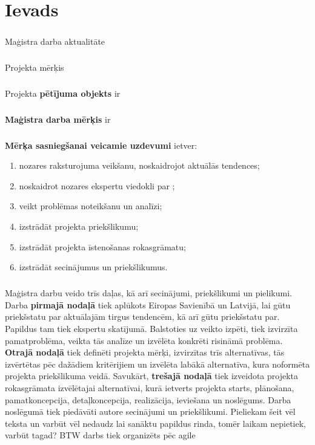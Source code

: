 \chapter*{Ievads} %
\paragraph{}
Maģistra darba aktualitāte
\paragraph{}
Projekta mērķis
\paragraph{}
Projekta \textbf{pētījuma objekts} ir 
\paragraph{}
\textbf{Maģistra darba mērķis} ir 
\paragraph{}
\textbf{Mērķa sasniegšanai veicamie uzdevumi} ietver:
\begin{enumerate}
    \item nozares raksturojuma veikšanu, noskaidrojot aktuālās tendences;
    \item noskaidrot nozares ekspertu viedokli par ;
    \item veikt problēmas noteikšanu un analīzi;
    \item izstrādāt projekta priekšlikumu;
    \item izstrādāt projekta īstenošanas rokasgrāmatu;
    \item izstrādāt secinājumus un priekšlikumus.
\end{enumerate}
\paragraph{}
Maģistra darbu veido trīs daļas, kā arī secinājumi, priekšlikumi un pielikumi.
Darba \textbf{pirmajā nodaļā} tiek aplūkots Eiropas Savienībā un Latvijā, lai gūtu priekšstatu par 
aktuālajām tirgus tendencēm, kā arī gūtu priekšstatu par. Papildus tam tiek ekspertu skatījumā. 
Balstoties uz veikto izpēti, tiek izvirzīta pamatproblēma, veikta tās analīze un izvēlēta konkrēti
risināmā problēma. 
\textbf{Otrajā nodaļā} tiek definēti projekta mērķi,
izvirzītas trīs alternatīvas, tās izvērtētas pēc dažādiem kritērijiem un izvēlēta labākā alternatīva, 
kura noformēta projekta priekšlikuma veidā. 
Savukārt, \textbf{trešajā nodaļā} tiek izveidota projekta
rokasgrāmata izvēlētajai alternatīvai, kurā ietverts projekta starts, plānošana, pamatkoncepcija,
detaļkoncepcija, realizācija, ieviešana un noslēgums. 
Darba noslēgumā tiek piedāvāti autore secinājumi un priekšlikumi. Pieliekam šeit vēl teksta un 
varbūt vēl nedaudz lai sanāktu papildus rinda, tomēr laikam nepietiek, varbūt tagad? BTW darbs tiek
organizēts pēc \gls{agile}
